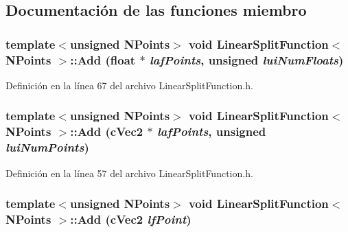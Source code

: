 \subsection{Documentación de las funciones miembro}
\hypertarget{class_linear_split_function_aa84e69579d2a5317d26458dc0cda5373}{
\subsubsection[{Add}]{\setlength{\rightskip}{0pt plus 5cm}template$<$unsigned NPoints$>$ void {\bf LinearSplitFunction}$<$ NPoints $>$::Add (float $\ast$ {\em lafPoints}, \/  unsigned {\em luiNumFloats})}}
\label{class_linear_split_function_aa84e69579d2a5317d26458dc0cda5373}


Definición en la línea 67 del archivo LinearSplitFunction.h.

\hypertarget{class_linear_split_function_a5ea10194a4be6d3f6a138eaeb2499d1b}{
\subsubsection[{Add}]{\setlength{\rightskip}{0pt plus 5cm}template$<$unsigned NPoints$>$ void {\bf LinearSplitFunction}$<$ NPoints $>$::Add ({\bf cVec2} $\ast$ {\em lafPoints}, \/  unsigned {\em luiNumPoints})}}
\label{class_linear_split_function_a5ea10194a4be6d3f6a138eaeb2499d1b}


Definición en la línea 57 del archivo LinearSplitFunction.h.

\hypertarget{class_linear_split_function_a07304e4b330734898dfa75a7a32dfba8}{
\subsubsection[{Add}]{\setlength{\rightskip}{0pt plus 5cm}template$<$unsigned NPoints$>$ void {\bf LinearSplitFunction}$<$ NPoints $>$::Add ({\bf cVec2} {\em lfPoint})}}
\label{class_linear_split_function_a07304e4b330734898dfa75a7a32dfba8}


